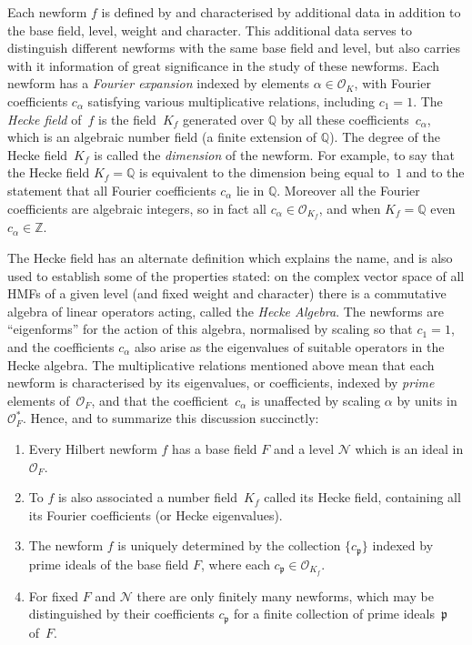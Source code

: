 \documentclass{llncs}
\def\Z{{\mathbb Z}}
\def\Q{{\mathbb Q}}
\def\N{{\mathcal{N}}}
\def\O{{\mathcal{O}}}
\def\p{{\mathfrak{p}}}
\begin{document}
Each newform $f$ is defined by and characterised by additional data in
addition to the base field, level, weight and character.  This
additional data serves to distinguish different newforms with the same
base field and level, but also carries with it information of great
significance in the study of these newforms.  Each newform has a
\emph{Fourier expansion} indexed by elements $\alpha\in\O_K$, with
Fourier coefficients $c_{\alpha}$ satisfying various multiplicative
relations, including $c_1=1$.  The \emph{Hecke field} of~$f$ is the
field~$K_f$ generated over $\Q$ by all these
coefficients~$c_{\alpha}$, which is an algebraic number field (a
finite extension of $\Q$).  The degree of the Hecke field~$K_f$ is
called the \emph{dimension} of the newform.  For example, to say that
the Hecke field $K_f=\Q$ is equivalent to the dimension being equal
to~$1$ and to the statement that all Fourier coefficients $c_{\alpha}$
lie in $\Q$.  Moreover all the Fourier coefficients are algebraic
integers, so in fact all $c_{\alpha}\in\O_{K_f}$, and when $K_f=\Q$
even $c_{\alpha}\in\Z$.

The Hecke field has an alternate definition which explains the name,
and is also used to establish some of the properties stated: on the
complex vector space of all HMFs of a given level (and fixed weight
and character) there is a commutative algebra of linear operators
acting, called the \emph{Hecke Algebra}.  The newforms are
``eigenforms'' for the action of this algebra, normalised by scaling
so that $c_1=1$, and the coefficients $c_{\alpha}$ also arise as the
eigenvalues of suitable operators in the Hecke algebra.  The
multiplicative relations mentioned above mean that each newform is
characterised by its eigenvalues, or coefficients, indexed by
\emph{prime} elements of~$\O_F$, and that the coefficient~$c_{\alpha}$
is unaffected by scaling $\alpha$ by units in $\O_F^*$.  Hence, and to
summarize this discussion succinctly:
\begin{enumerate}
\item Every Hilbert newform $f$ has a base field $F$ and a level $\N$
  which is an ideal in $\O_F$.
\item To $f$ is also associated a number field~$K_f$ called its Hecke
  field, containing all its Fourier coefficients (or Hecke
  eigenvalues).
\item The newform $f$ is uniquely determined by the collection
  $\{c_\p\}$ indexed by prime ideals of the base field $F$, where each
  $c_{\p}\in\O_{K_f}$.
\item For fixed $F$ and $\N$ there are only finitely many newforms,
  which may be distinguished by their coefficients $c_\p$ for a finite
  collection of prime ideals~$\p$ of~$F$.
\end{enumerate}
\end{document}

